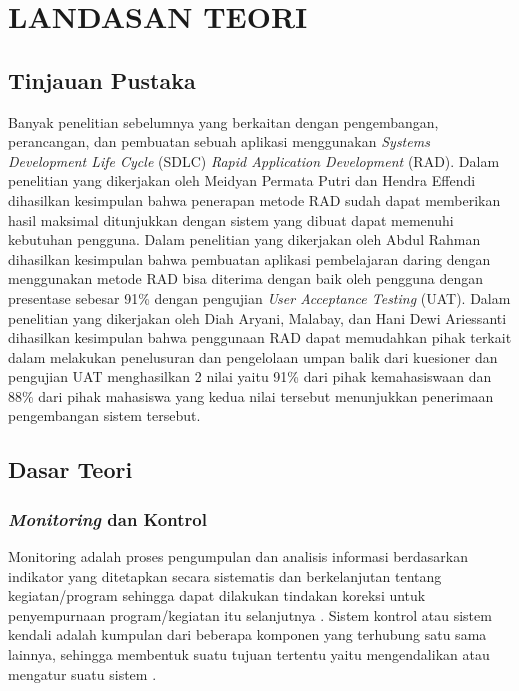 \chapter{LANDASAN TEORI}

%
\vspace{4.5pt}

\begin{flushleft}
    \begin{justify}
        \section{Tinjauan Pustaka}
    Banyak penelitian sebelumnya yang berkaitan dengan pengembangan, perancangan, dan pembuatan sebuah aplikasi menggunakan
    \textit{Systems Development Life Cycle} (SDLC) \textit{Rapid Application Development} (RAD). Dalam penelitian yang dikerjakan oleh
    Meidyan Permata Putri dan Hendra Effendi \cite{web waterfall} dihasilkan kesimpulan bahwa penerapan metode RAD sudah dapat memberikan hasil maksimal ditunjukkan dengan sistem yang dibuat
    dapat memenuhi kebutuhan pengguna. Dalam penelitian yang dikerjakan oleh Abdul Rahman \cite{jurnal RAD UAT} dihasilkan kesimpulan bahwa pembuatan aplikasi pembelajaran daring dengan menggunakan metode RAD bisa diterima dengan baik oleh pengguna dengan presentase sebesar 91\% dengan pengujian \textit{User Acceptance Testing} (UAT).
    Dalam penelitian yang dikerjakan oleh Diah Aryani, Malabay, dan Hani Dewi Ariessanti \cite{jurnal RAD UAT 2} dihasilkan kesimpulan bahwa penggunaan RAD dapat memudahkan pihak terkait dalam melakukan penelusuran dan pengelolaan umpan balik dari kuesioner dan
    pengujian UAT menghasilkan 2 nilai yaitu 91\% dari pihak kemahasiswaan dan 88\% dari pihak mahasiswa yang kedua nilai tersebut menunjukkan penerimaan pengembangan sistem tersebut.

    \vspace{1cm}
    \section{Dasar Teori}

        \subsection{\textit{Monitoring} dan Kontrol}
        Monitoring adalah proses pengumpulan
        dan analisis informasi berdasarkan indikator yang ditetapkan secara sistematis dan
        berkelanjutan tentang kegiatan/program sehingga dapat dilakukan tindakan
        koreksi untuk penyempurnaan program/kegiatan itu selanjutnya \cite{Monitoring}.
        Sistem kontrol atau
        sistem kendali adalah kumpulan dari beberapa komponen yang terhubung satu
        sama lainnya, sehingga membentuk suatu tujuan tertentu yaitu mengendalikan
        atau mengatur suatu sistem \cite{Kontrol}. 
        \\


\end{justify}
\end{flushleft}

